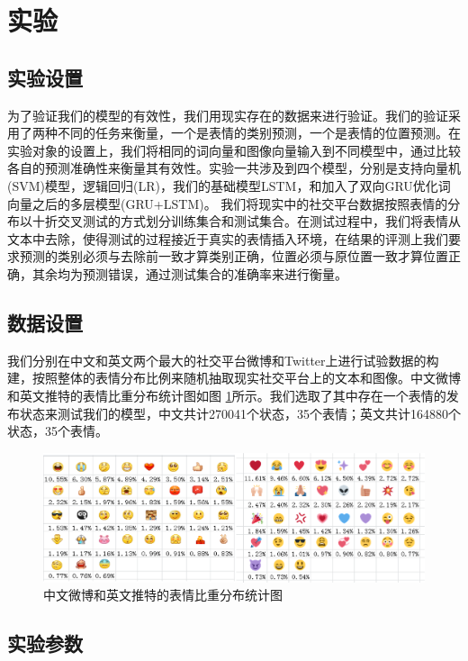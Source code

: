 \documentclass[10pt, titlepage]{article}
\begin{document}
\section{实验}

\subsection{实验设置}

为了验证我们的模型的有效性，我们用现实存在的数据来进行验证。我们的验证采用了两种不同的任务来衡量，一个是表情的类别预测，一个是表情的位置预测。在实验对象的设置上，我们将相同的词向量和图像向量输入到不同模型中，通过比较各自的预测准确性来衡量其有效性。实验一共涉及到四个模型，分别是支持向量机(SVM)模型，逻辑回归(LR)，我们的基础模型LSTM，和加入了双向GRU优化词向量之后的多层模型(GRU+LSTM)。
我们将现实中的社交平台数据按照表情的分布以十折交叉测试的方式划分训练集合和测试集合。在测试过程中，我们将表情从文本中去除，使得测试的过程接近于真实的表情插入环境，在结果的评测上我们要求预测的类别必须与去除前一致才算类别正确，位置必须与原位置一致才算位置正确，其余均为预测错误，通过测试集合的准确率来进行衡量。

\subsection{数据设置}

		我们分别在中文和英文两个最大的社交平台微博和Twitter上进行试验数据的构建，按照整体的表情分布比例来随机抽取现实社交平台上的文本和图像。中文微博和英文推特的表情比重分布统计图如图 \ref{fig:tongji}所示。我们选取了其中存在一个表情的发布状态来测试我们的模型，中文共计270041个状态，35个表情；英文共计164880个状态，35个表情。

		\begin{figure}[htb]
		\centering
		\includegraphics[width=0.8\columnwidth]{figs/fenbu.png}
		\caption{中文微博和英文推特的表情比重分布统计图}
		\label{fig:tongji}
		\end{figure}


\subsection{实验参数}
\end{document}
